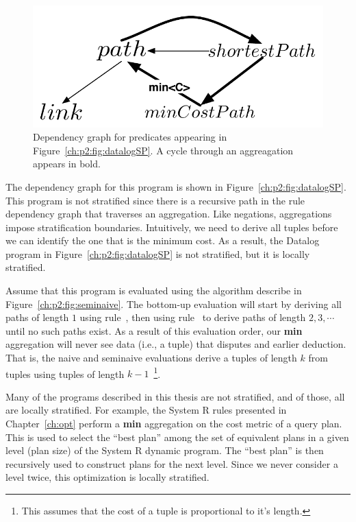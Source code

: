 \begin{figure} 
\ssp
\begin{center}
\includegraphics[scale=1]{figures/dependency-graph2}
\caption{\label{ch:p2:fig:dependency2}Dependency graph for predicates 
appearing in Figure~\ref{ch:p2:fig:datalogSP}. A cycle through an aggreagation
appears in bold. }
\end{center} 
\end{figure}

The dependency graph for this program is shown in
Figure~\ref{ch:p2:fig:datalogSP}.  This program is not stratified since there
is a recursive path in the rule dependency graph that traverses an aggregation.
Like negations, aggregations impose stratification boundaries.  Intuitively, we
need to derive all  tuples before we can identify the one that is the
minimum cost.  As a result, the Datalog program in
Figure~\ref{ch:p2:fig:datalogSP} is not stratified, but it is locally
stratified.

Assume that this program is evaluated using the algorithm describe in
Figure~\ref{ch:p2:fig:seminaive}. The bottom-up evaluation will start by
deriving all paths of length $1$ using rule~, then using rule~
to derive paths of length $2, 3, \cdots$ until no such paths exist. As a
result of this evaluation order, our {\bf min} aggregation will never see
data (i.e., a  tuple) that disputes and earlier deduction. That is,
the naive and seminaive evaluations derive a  tuples of length $k$ from
 tuples using  tuples of length $k-1$~\footnote{This assumes
that the cost of a  tuple is proportional to it's length.}. 

Many of the programs described in this thesis are not stratified, and of those,
all are locally stratified.  For example, the System R rules presented in
Chapter~\ref{ch:opt} perform a {\bf min} aggregation on the cost metric of a
query plan.  This is used to select the ``best plan'' among the set of
equivalent plans in a given level (plan size) of the System R dynamic program.
The ``best plan'' is then recursively used to construct plans for the next
level.  Since we never consider a level twice, this optimization is locally
stratified.


